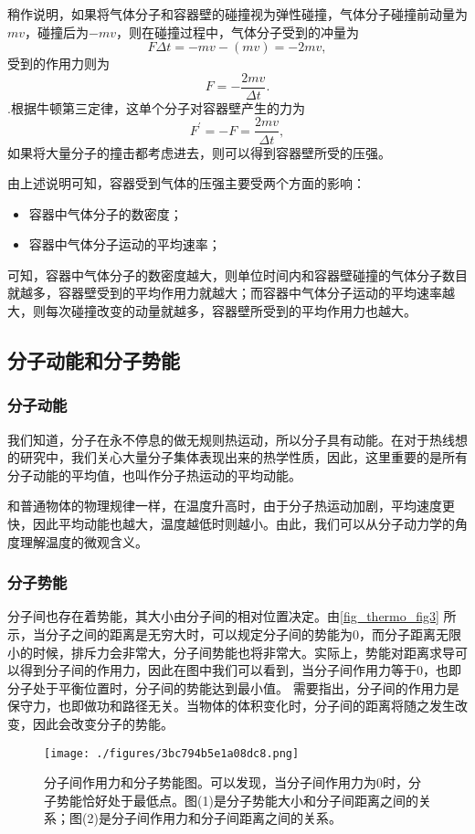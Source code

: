 稍作说明，如果将气体分子和容器壁的碰撞视为弹性碰撞，气体分子碰撞前动量为$mv$，碰撞后为$-mv$，则在碰撞过程中，气体分子受到的冲量为$$F\Delta t=-mv-(mv)=-2mv,$$受到的作用力则为$$F=-\dfrac{2mv}{\Delta t}.$$.根据牛顿第三定律，这单个分子对容器壁产生的力为$$F^\prime=-F=\dfrac{2mv}{\Delta t},$$如果将大量分子的撞击都考虑进去，则可以得到容器壁所受的压强。

由上述说明可知，容器受到气体的压强主要受两个方面的影响：
\begin{itemize}
\item 容器中气体分子的数密度；
\item 容器中气体分子运动的平均速率；
\end{itemize}
可知，容器中气体分子的数密度越大，则单位时间内和容器壁碰撞的气体分子数目就越多，容器壁受到的平均作用力就越大；而容器中气体分子运动的平均速率越大，则每次碰撞改变的动量就越多，容器壁所受到的平均作用力也越大。
\subsection{分子动能和分子势能}
\subsubsection{分子动能}
我们知道，分子在永不停息的做无规则热运动，所以分子具有动能。在对于热线想的研究中，我们关心大量分子集体表现出来的热学性质，因此，这里重要的是所有分子动能的平均值，也叫作分子热运动的平均动能。

和普通物体的物理规律一样，在温度升高时，由于分子热运动加剧，平均速度更快，因此平均动能也越大，温度越低时则越小。由此，我们可以从分子动力学的角度理解温度的微观含义。

\subsubsection{分子势能}
分子间也存在着势能，其大小由分子间的相对位置决定。由\autoref{fig_thermo_fig3} 所示，当分子之间的距离是无穷大时，可以规定分子间的势能为$0$，而分子距离无限小的时候，排斥力会非常大，分子间势能也将非常大。实际上，势能对距离求导可以得到分子间的作用力，因此在图中我们可以看到，当分子间作用力等于$0$，也即分子处于平衡位置时，分子间的势能达到最小值。
需要指出，分子间的作用力是保守力，也即做功和路径无关。当物体的体积变化时，分子间的距离将随之发生改变，因此会改变分子的势能。

\begin{figure}[ht]
\centering
\texttt{[image: ./figures/3bc794b5e1a08dc8.png]}
\caption{分子间作用力和分子势能图。可以发现，当分子间作用力为$0$时，分子势能恰好处于最低点。图(1)是分子势能大小和分子间距离之间的关系；图(2)是分子间作用力和分子间距离之间的关系。} \label{fig_thermo_fig3}
\end{figure}


